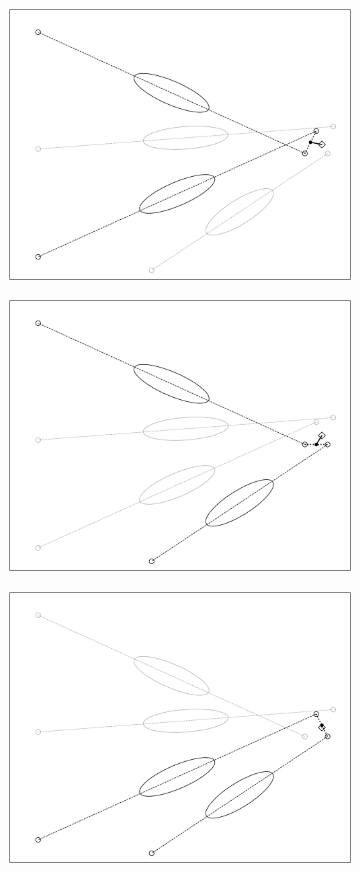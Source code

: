 \begin{figure}
\begin{subfigure}{0.3\textwidth}
    \end{subfigure}
    \begin{subfigure}{0.3\textwidth}
        \includegraphics[width=0.9\linewidth]{../Plots/stereo_magic_4.pdf} 
    \end{subfigure}
    \begin{subfigure}{0.3\textwidth}
        \includegraphics[width=0.9\linewidth]{../Plots/stereo_magic_5.pdf}
    \end{subfigure}
    \begin{subfigure}{0.3\textwidth}
        \includegraphics[width=0.9\linewidth]{../Plots/stereo_magic_6.pdf} 

\end{subfigure}
\end{figure}
